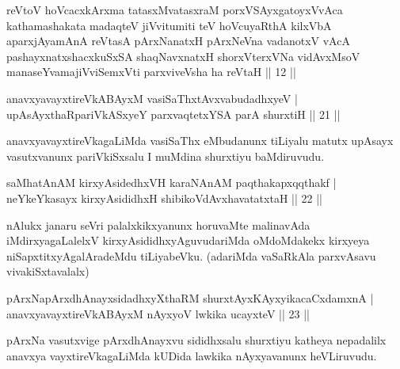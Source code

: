\begin{kandikeshl}
reVtoV hoVcacxkArxma tatasxMvatasxraM porxVSAyxgatoyxVvAca kathamashakata madaqteV jiVvitumiti teV hoVcuyaRthA kilxVbA aparxjAyamAnA reVtasA pArxNanatxH pArxNeVna vadanotxV vAcA pashayxnatxshacxkuSxSA shaqNavxnatxH shorxVterxVNa vidAvxMsoV manaseYvamajiVviSemxVti parxviveVsha ha reVtaH || 12 ||
\end{kandikeshl}


\begin{shl}
anavxyavayxtireVkABAyxM vasiSaThxtAvxvabudadhxyeV | \\
upAsAyxthaRpariVkASxyeY parxvaqtetxYSA parA shurxtiH \hfill|| 21 || 
\end{shl}

\begin{artha}
anavxyavayxtireVkagaLiMda vasiSaThx eMbudanunx tiLiyalu matutx upAsayx vasutxvanunx pariVkiSxsalu I muMdina shurxtiyu baMdiruvudu.
\end{artha}


\begin{shl}
saMhatAnAM kirxyAsidedhxVH karaNAnAM paqthakapxqqthakf | \\
neYkeYkasayx kirxyAsididhxH shibikoVdAvxhavatatxtaH \hfill|| 22 || 
\end{shl}

\begin{artha}
nAlukx janaru seVri palalxkikxyanunx horuvaMte malinavAda 
iMdirxyagaLalelxV kirxyAsididhxyAguvudariMda oMdoMdakekx kirxyeya 
niSapxtitxyAgalAradeMdu tiLiyabeVku. (adariMda vaSaRkAla parxvAsavu 
vivakiSxtavalalx)
\end{artha}

\begin{shl}
pArxNapArxdhAnayxsidadhxyXthaRM shurxtAyx\s \s KAyxyikacaCxdamxnA | \\
anavxyavayxtireVkABAyxM nAyxyoV lwkika ucayxteV \hfill|| 23 || 
\end{shl}

\begin{artha}
pArxNa vasutxvige pArxdhAnayxvu sididhxsalu shurxtiyu katheya nepadalilx anavxya vayxtireVkagaLiMda kUDida lawkika nAyxyavanunx heVLiruvudu.
\end{artha}


